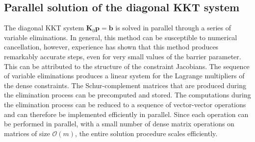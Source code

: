 \documentclass[12pt]{article}
\newcommand{\mb}{\mathbf}
\begin{document}
\subsection{Parallel solution of the diagonal KKT system}

The diagonal KKT system $\mb{K}_{0} \mb{p} = \mb{b}$ is solved in parallel through a series of variable eliminations.
In general, this method can be susceptible to numerical cancellation, however, experience has shown that this method produces remarkably accurate steps, even for very small values of the barrier parameter.
This can be attributed to the structure of the constraint Jacobians.
The sequence of variable eliminations produces a linear system for the Lagrange multipliers of the dense constraints.
The Schur-complement matrices that are produced during the elimination process can be precomputed and stored.
The computations during the elimination process can be reduced to a sequence of vector-vector operations and can therefore be implemented efficiently in parallel.
Since each operation can be performed in parallel, with a small number of dense matrix operations on matrices of size $\mathcal{O}(m)$, the entire solution procedure scales efficiently.
\end{document}
